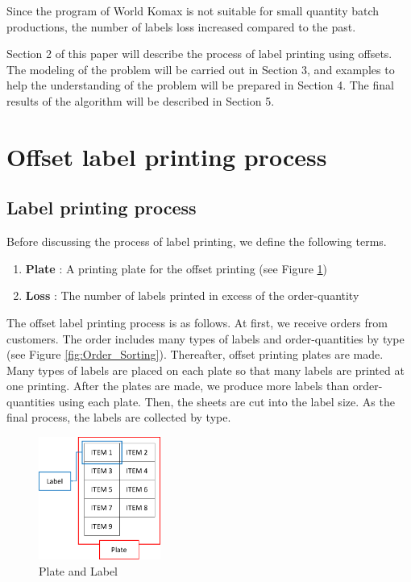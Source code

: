 \documentclass[a4paper]{amsart}
\numberwithin{equation}{section} %
\numberwithin{figure}{section} %
\numberwithin{table}{section}
\theoremstyle{plain}
\theoremstyle{definition}
\theoremstyle{plain}
\theoremstyle{plain}
\theoremstyle{plain}
\theoremstyle{plain}
\theoremstyle{plain}
\begin{document}
\noindent
Since the program of World Komax is not suitable for small quantity batch productions, the number of labels loss increased compared to the past.

Section 2 of this paper will describe the process of label printing using offsets. The modeling of the problem will be carried out in Section 3, and examples to help the understanding of the problem will be prepared in Section 4. The final results of the algorithm will be described in Section 5. 


\section{Offset label printing process}\label{sec:Offset}

\subsection{Label printing process}\label{subsec:LabelPrinting}
Before discussing the process of label printing, we define the following terms.
\begin{enumerate}[*]
	\item {\bf Plate} : A printing plate for the offset printing (see Figure \ref{fig:PlateLabel})
	\item {\bf Loss} : The number of labels printed in excess of the order-quantity
\end{enumerate}

The offset label printing process is as follows. At first, we receive orders from customers. The order includes many types of labels and order-quantities by type (see Figure \ref{fig:Order_Sorting}). Thereafter, offset printing plates are made. Many types of labels are placed on each plate so that many labels are printed at one printing. After the plates are made, we produce more labels than order-quantities using each plate. Then, the sheets are cut into the label size. As the final process, the labels are collected by type.

\begin{figure}
	\includegraphics[width=4cm]{PlateLabel.pdf}
	\caption{Plate and Label}
	\label{fig:PlateLabel}       %
\end{figure}
\end{document}
